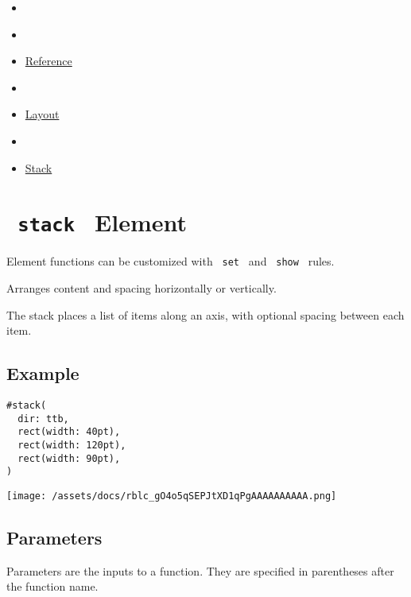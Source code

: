 \begin{itemize}
\tightlist
\item
  \href{/docs}{}
\item
  
\item
  \href{/docs/reference/}{Reference}
\item
  
\item
  \href{/docs/reference/layout/}{Layout}
\item
  
\item
  \href{/docs/reference/layout/stack/}{Stack}
\end{itemize}

\section{\texorpdfstring{\texttt{\ stack\ } {{ Element
}}}{ stack   Element }}\label{summary}

\label{element-tooltip}
Element functions can be customized with \texttt{\ set\ } and
\texttt{\ show\ } rules.

Arranges content and spacing horizontally or vertically.

The stack places a list of items along an axis, with optional spacing
between each item.

\subsection{Example}\label{example}

\begin{verbatim}
#stack(
  dir: ttb,
  rect(width: 40pt),
  rect(width: 120pt),
  rect(width: 90pt),
)
\end{verbatim}

\texttt{[image: /assets/docs/rblc\_gO4o5qSEPJtXD1qPgAAAAAAAAAA.png]}

\subsection{\texorpdfstring{{ Parameters
}}{ Parameters }}\label{parameters}

\label{parameters-tooltip}
Parameters are the inputs to a function. They are specified in
parentheses after the function name.

